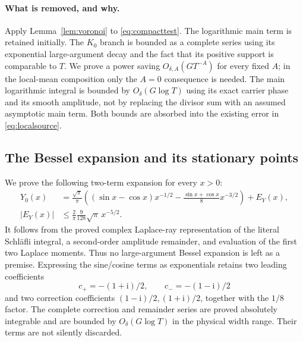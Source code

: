 \documentclass[11pt,a4paper]{article}
\numberwithin{equation}{section}
\theoremstyle{definition}
\newcommand{\ii}{\mathrm i}
\begin{document}
\paragraph{What is removed, and why.}
Apply Lemma~\ref{lem:voronoi} to \eqref{eq:compacttest}. The logarithmic main
term is retained initially. The $K_0$ branch is bounded as a complete series
using its exponential large-argument decay and the fact that its positive
support is comparable to $T$. We prove a power saving
$O_{\delta,A}(GT^{-A})$ for every fixed $A$; in the local-mean
composition only the $A=0$ consequence is needed. The main logarithmic
integral is bounded by $O_\delta(G\log T)$ using its exact carrier phase and
its smooth amplitude, not by replacing the divisor sum with an assumed
asymptotic main term. Both bounds are absorbed into the existing error in
\eqref{eq:localsource}.

\subsection{The Bessel expansion and its stationary points}
We prove the following two-term expansion for every $x>0$:
\begin{align}\label{eq:Ytwo}
 Y_0(x)&=\frac{\sqrt\pi}\pi\left((\sin x-\cos x)x^{-1/2}
           -\frac{\sin x+\cos x}{8}x^{-3/2}\right)+E_Y(x),\\
 |E_Y(x)|&\le\frac2\pi\frac9{128}\sqrt\pi\,x^{-5/2}.\nonumber
\end{align}
It follows from the proved complex Laplace-ray representation of the literal
Schl\"afli integral, a second-order amplitude remainder, and evaluation of the
first two Laplace moments. Thus no large-argument Bessel expansion is left as
a premise. Expressing the sine/cosine terms as exponentials retains two leading
coefficients
\[
 c_+=-(1+\ii)/2,\qquad c_-=-(1-\ii)/2
\]
and two correction coefficients $(1-\ii)/2,(1+\ii)/2$, together with the
$1/8$ factor. The complete correction and remainder series are proved
absolutely integrable and are bounded by $O_\delta(G\log T)$ in the physical
width range. Their terms are not silently discarded.
\end{document}
